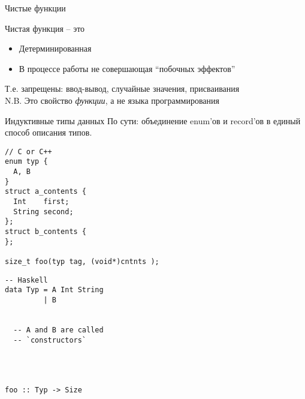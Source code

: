 \documentclass[aspectratio=169
  , xcolor={svgnames}
  , hyperref={ colorlinks,citecolor=DeepPink4
             , linkcolor=DarkRed,urlcolor=DarkBlue}
  , russian
  ]{beamer}
\theoremstyle{exerciseStyle1}
\begin{document}
\begin{frame}[fragile]{Чистые функции}
\begin{definition}{Чистая функция -- это}
  \begin{itemize}
    \item Детерминированная
    \item В процессе работы не совершающая ``побочных эффектов''
  \end{itemize}
\end{definition}
Т.е. запрещены: ввод-вывод, случайные значения, присваивания\\

N.B. Это свойство \emph{функции}, а не языка программирования

\end{frame}


\begin{frame}[fragile]{Индуктивные типы данных}
По сути: объединение enum'ов и  record'ов в единый способ описания типов.\\

\begin{minipage}{.58\textwidth}
\begin{verbatim}
// C or C++
enum typ {
  A, B
}
struct a_contents {
  Int    first;
  String second;
};
struct b_contents {
};

size_t foo(typ tag, (void*)cntnts );
\end{verbatim}
\end{minipage}
\begin{minipage}{.38\textwidth}
\begin{verbatim}
-- Haskell
data Typ = A Int String
         | B
         
         
  -- A and B are called 
  -- `constructors` 
         
         
         
         
foo :: Typ -> Size         
\end{verbatim}
\end{minipage}
\end{frame}
\end{document}
